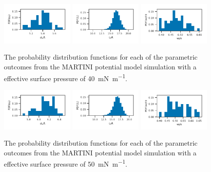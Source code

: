 \documentclass[amsmath,amssymb,superscriptaddress]{revtex4-1}
\begin{document}
%
%
\begin{figure}
 \centering
 \includegraphics[width=0.32\textwidth]{martini_40_dh}
 \includegraphics[width=0.32\textwidth]{martini_40_tt}
 \includegraphics[width=0.32\textwidth]{martini_40_wph}
 \caption{The probability distribution functions for each of the parametric outcomes from the MARTINI potential model simulation with a effective surface pressure of \SI{40}{\milli\newton\per\meter}.}
 \label{fig:ma40}
\end{figure}
%
%
\begin{figure}
 \centering
 \includegraphics[width=0.32\textwidth]{martini_50_dh}
 \includegraphics[width=0.32\textwidth]{martini_50_tt}
 \includegraphics[width=0.32\textwidth]{martini_50_wph}
 \caption{The probability distribution functions for each of the parametric outcomes from the MARTINI potential model simulation with a effective surface pressure of \SI{50}{\milli\newton\per\meter}.}
 \label{fig:ma50}
\end{figure}
%


\end{document}
